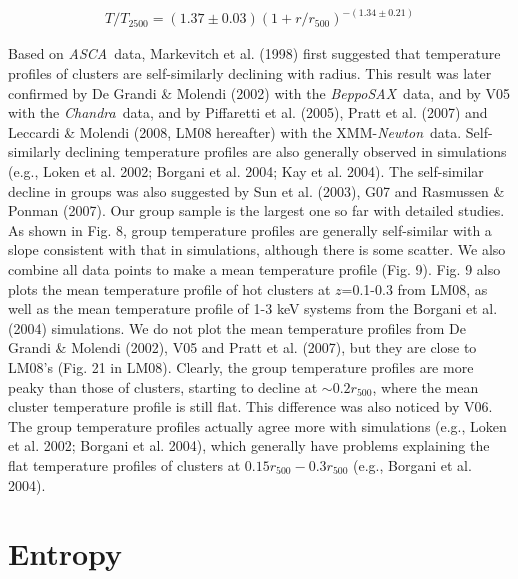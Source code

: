 \documentclass{aastex}
\def\asca       {{\em ASCA}\/}
\def\chandra    {{\em Chandra}\/}
\def\xmm        {XMM-{\em Newton}\/}
\def\sax        {{\em BeppoSAX}\/}
\begin{document}
\begin{eqnarray}
T/T_{2500} = (1.37\pm0.03) (1 + r/r_{500})^{-(1.34\pm0.21)} 
\end{eqnarray}

Based on \asca\ data, Markevitch et al. (1998) first suggested that temperature
profiles of clusters are self-similarly declining with radius. This result
was later confirmed by De Grandi \& Molendi (2002) with the \sax\ data, and
by V05 with the \chandra\ data, and by Piffaretti et al. (2005),
Pratt et al. (2007) and Leccardi \& Molendi (2008, LM08 hereafter) with the \xmm\
data. Self-similarly declining temperature profiles
are also generally observed in simulations (e.g., Loken et al. 2002; Borgani et al.
2004; Kay et al. 2004). The self-similar decline in groups was also suggested
by Sun et al. (2003), G07 and Rasmussen \& Ponman (2007).
Our group sample is the largest one so far with detailed studies.
As shown in Fig. 8, group temperature profiles are generally self-similar with
a slope consistent with that in simulations, although there is some scatter.
We also combine all data points to make a mean temperature profile (Fig. 9).
Fig. 9 also plots the mean temperature profile of hot clusters at $z$=0.1-0.3
from LM08, as well as the mean temperature profile
of 1-3 keV systems from the Borgani et al. (2004) simulations.
We do not plot the mean temperature profiles from De Grandi \& Molendi (2002),
V05 and Pratt et al. (2007), but they are close to LM08's (Fig. 21 in LM08).
Clearly, the group temperature profiles are more peaky than those of clusters,
starting to decline at $\sim 0.2 r_{500}$, where the mean cluster temperature
profile is still flat. This difference was also noticed by V06.
The group temperature profiles actually agree more with simulations (e.g., Loken et al. 2002;
Borgani et al. 2004), which generally have problems explaining the flat
temperature profiles of clusters at $0.15 r_{500} - 0.3 r_{500}$ (e.g., Borgani et al. 2004).

\section{Entropy}
\end{document}
